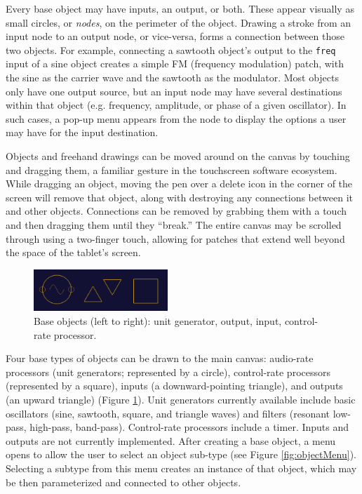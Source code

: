 \documentclass[10pt,letterpaper]{article}
\begin{document}
Every base object may have inputs, an output, or both. These appear visually as small circles, or \emph{nodes}, on the perimeter of the object. 
Drawing a stroke from an input node to an output node, or vice-versa, forms a connection between those two objects. 
For example, connecting a sawtooth object's output to the \texttt{freq} input of a sine object creates a simple FM (frequency modulation) patch, with the sine as the carrier wave and the sawtooth as the modulator. 
Most objects only have one output source, but an input node may have several destinations within that object (e.g. frequency, amplitude, or phase of a given oscillator). 
In such cases, a pop-up menu appears from the node to display the options a user may have for the input destination. 

Objects and freehand drawings can be moved around on the canvas by touching and dragging them, a familiar gesture in the touchscreen software ecosystem. 
While dragging an object, moving the pen over a delete icon in the corner of the screen will remove that object, along with destroying any connections between it and other objects. 
Connections can be removed by grabbing them with a touch and then dragging them until they ``break.''
The entire canvas may be scrolled through using a two-finger touch, allowing for patches that extend well beyond the space of the tablet's screen. 

\begin{figure}[h]
	\centering
		\includegraphics[width=0.45\textwidth]{figures/baseobjects.png}
	\caption{Base objects (left to right): unit generator, output, input, control-rate processor.}
	\label{fig:baseObjects}
\end{figure}

Four base types of objects can be drawn to the main canvas: audio-rate processors (unit generators; represented by a circle), control-rate processors (represented by a square), inputs (a downward-pointing triangle), and outputs (an upward triangle) (Figure \ref{fig:baseObjects}). 
Unit generators currently available include basic oscillators (sine, sawtooth, square, and triangle waves) and filters (resonant low-pass, high-pass, band-pass). 
Control-rate processors include a timer. 
Inputs and outputs are not currently implemented. 
After creating a base object, a menu opens to allow the user to select an object sub-type (see Figure \ref{fig:objectMenu}). Selecting a subtype from this menu creates an instance of that object, which may be then parameterized and connected to other objects. 
\end{document}
